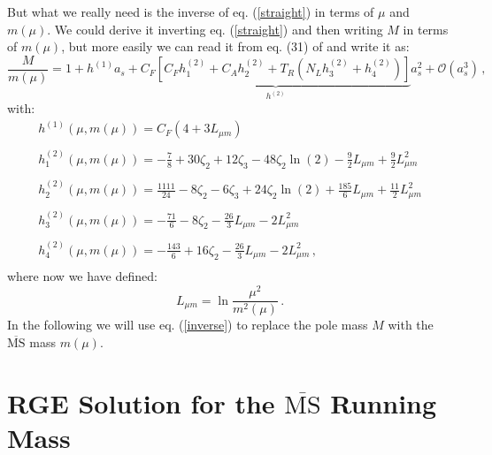 \documentclass[10pt,a4paper]{article}
\begin{document}
But what we really need is the inverse of eq. (\ref{straight}) in terms of $\mu$ and $m(\mu)$. We could derive it inverting eq. (\ref{straight}) and then writing $M$ in terms of $m(\mu)$, but more easily we can read it from eq. (31) of \cite{Chetyrkin:1999qi} and write it as:
\begin{equation}
\frac{M}{m(\mu)} = 1 +
h^{(1)}a_s+\underbrace{C_F\left[C_Fh_1^{(2)}+C_Ah_2^{(2)}+T_R\left(N_Lh_3^{(2)}+h_4^{(2)}\right)\right]}_{h^{(2)}}a_s^2+\mathcal{O}(a_s^3)\,,
\label{inverse}
\end{equation}
with:
\begin{equation}
\begin{array}{l}
\displaystyle h^{(1)}(\mu,m(\mu)) = C_F\left(4 + 3L_{\mu m}\right)\\
\\
\displaystyle h_{1}^{(2)}(\mu,m(\mu)) = -\frac{7}{8} + 30\zeta_2 + 12\zeta_3 - 48\zeta_2\ln(2) - \frac{9}2L_{\mu m} + \frac92 L_{\mu m}^2\\
\\
\displaystyle h_{2}^{(2)}(\mu,m(\mu)) = \frac{1111}{24} - 8\zeta_2 - 6\zeta_3 + 24\zeta_2\ln(2) + \frac{185}6L_{\mu m} + \frac{11}2 L_{\mu m}^2\\
\\
\displaystyle h_{3}^{(2)}(\mu,m(\mu)) = - \frac{71}{6} - 8\zeta_2 - \frac{26}3L_{\mu m} - 2 L_{\mu m}^2\\
\\
\displaystyle h_{4}^{(2)}(\mu,m(\mu)) = -\frac{143}{6} + 16\zeta_2 - \frac{26}3L_{\mu m} - 2 L_{\mu m}^2\,,\\
\end{array}
\label{coeffinv}
\end{equation}
where now we have defined:
\begin{equation}
L_{\mu m} = \ln\frac{\mu^2}{m^2(\mu)}\,.
\end{equation}
In the following we will use eq. (\ref{inverse}) to replace the pole mass $M$ with the $\overline{\mbox{MS}}$ mass $m(\mu)$.


\section{RGE Solution for the $\overline{\mbox{MS}}$ Running Mass}
\end{document}
